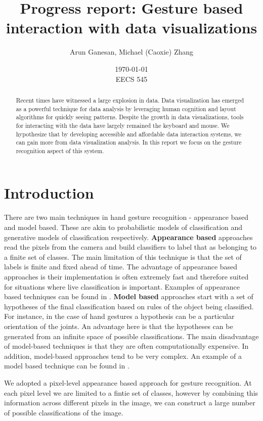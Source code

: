 \documentclass[11pt]{article}
\title{Progress report: Gesture based interaction with data visualizations}
\author{Arun Ganesan, Michael (Caoxie) Zhang}
\date{\today\\ EECS 545}
\begin{document}
\maketitle

\begin{abstract}
Recent times have witnessed a large explosion in data. Data visualization has emerged as a powerful technique for data analysis by leveraging human cognition and layout algorithms for quickly seeing patterns. Despite the growth in data visualizations, tools for interacting with the data have largely remained the keyboard and mouse. We hypothesize that by developing accessible and affordable data interaction systems, we can gain more from data visualization analysis. In this report we focus on the gesture recognition aspect of this system.

\end{abstract}

\section{Introduction}
There are two main techniques in hand gesture recognition - appearance based and model based. These are akin to probabilistic models of classification and generative models of classification respectively. \textbf{Appearance based} approaches read the pixels from the camera and build classifiers to label that as belonging to a finite set of classes. The main limitation of this technique is that the set of labels is finite and fixed ahead of time. The advantage of appearance based approaches is their implementation is often extremely fast and therefore suited for situations where live classification is important. Examples of appearance based techniques can be found in \cite{shotton2011, wang2009}. \textbf{Model based} approaches start with a set of hypotheses of the final classification based on rules of the object being classified. For instance, in the case of hand gestures a hypothesis can be a particular orientation of the joints.  An advantage here is that the hypotheses can be generated from an infinite space of possible classifications. The main disadvantage of model-based techniques is that they are often computationally expensive. In addition, model-based approaches tend to be very complex. An example of a model based technique can be found in \cite{oikonomidis2011}.

We adopted a pixel-level appearance based approach for gesture recognition. At each pixel level we are limited to a fintie set of classes, however by combining this information across different pixels in the image, we can construct a large number of possible classifications of the image. 
\end{document}
